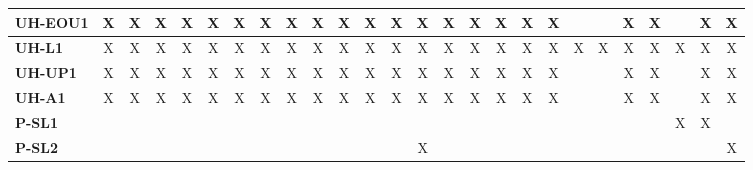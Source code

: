 \documentclass[12pt]{article}
\begin{document}
\begin{table}[H]
\begin{adjustwidth}{-1.4in}{-1in}
{\begin{tabular}{c|c|c|c|c|c|c|c|c|c|c|c|c|c|c|c|c|c|c|c|c|c|c|c|c|c|}
  \multicolumn{1}{|l|}{\textbf{UH-EOU1}} &       X      &       X      &       X      &       X      &       X      &       X      &       X      &       X      &       X      &       X      &       X      &       X      &       X      &       X      &       X      &       X      &       X      &       X      &              &              &       X      &       X      &              &       X      &       X       \\ \hline
  \multicolumn{1}{|l|}{\textbf{UH-L1}}   &       X      &       X      &       X      &       X      &       X      &       X      &       X      &       X      &       X      &       X      &       X      &       X      &       X      &       X      &       X      &       X      &       X      &       X      &       X      &       X      &       X      &       X      &       X      &       X      &       X       \\ \hline
  \multicolumn{1}{|l|}{\textbf{UH-UP1}}  &       X      &       X      &       X      &       X      &       X      &       X      &       X      &       X      &       X      &       X      &       X      &       X      &       X      &       X      &       X      &       X      &       X      &       X      &              &              &       X      &       X      &              &       X      &       X       \\ \hline
  \multicolumn{1}{|l|}{\textbf{UH-A1}}   &       X      &       X      &       X      &       X      &       X      &       X      &       X      &       X      &       X      &       X      &       X      &       X      &       X      &       X      &       X      &       X      &       X      &       X      &              &              &       X      &       X      &              &       X      &       X       \\ \hline
  \multicolumn{1}{|l|}{\textbf{P-SL1}}   &              &              &              &              &              &              &              &              &              &              &              &              &              &              &              &              &              &              &              &              &              &              &       X      &       X      &               \\ \hline
  \multicolumn{1}{|l|}{\textbf{P-SL2}}   &              &              &              &              &              &              &              &              &              &              &              &              &       X      &              &              &              &              &              &              &              &              &              &              &              &       X       \\ \hline

\end{tabular}}
\end{adjustwidth}
\end{table}
\end{document}
